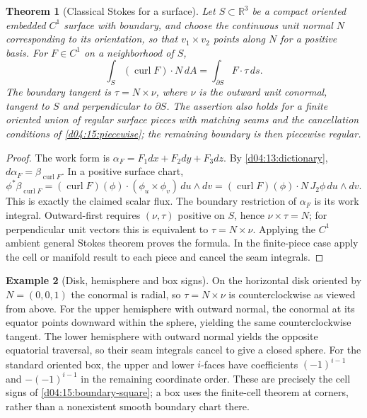 \documentclass[11pt,oneside,openany]{book}
\newtheorem{theorem}{Theorem}[chapter]
\theoremstyle{definition}
\newtheorem{example}[theorem]{Example}
\theoremstyle{remark}
\newcommand{\R}{\mathbb R}
\begin{document}
\begin{theorem}[Classical Stokes for a surface]\label{d04:12:surface-stokes}
Let $S\subset\R^3$ be a compact oriented embedded $C^1$ surface with
boundary, and choose the continuous unit normal $N$ corresponding to its
orientation, so that $v_1\times v_2$ points along $N$ for a positive basis.
For $F\in C^1$ on a neighborhood of $S$,
\[
 \int_S(\operatorname{curl}F)\cdot N\,dA
 =\int_{\partial S}F\cdot\tau\,ds.
\]
The boundary tangent is $\tau=N\times\nu$, where $\nu$ is the outward
unit conormal, tangent to $S$ and perpendicular to $\partial S$.
The assertion also holds for a finite oriented union of regular surface
pieces with matching seams and the cancellation conditions of
\cref{d04:15:piecewise}; the remaining boundary is then piecewise regular.
\end{theorem}
\begin{proof}
The work form is $\alpha_F=F_1dx+F_2dy+F_3dz$. By
\cref{d04:13:dictionary}, $d\alpha_F=\beta_{\operatorname{curl}F}$.
In a positive surface chart,
\[
 \phi^*\beta_{\operatorname{curl}F}
 =(\operatorname{curl}F)(\phi)\cdot(\phi_u\times\phi_v)\,du\wedge dv
 =(\operatorname{curl}F)(\phi)\cdot N\,J_2\phi\,du\wedge dv.
\]
This is exactly the claimed scalar flux. The boundary restriction of
$\alpha_F$ is its work integral. Outward-first requires $(\nu,\tau)$
positive on $S$, hence $\nu\times\tau=N$; for perpendicular unit vectors
this is equivalent to $\tau=N\times\nu$. Applying the $C^1$ ambient
general Stokes theorem proves the formula. In the finite-piece case apply
the cell or manifold result to each piece and cancel the seam integrals.
\end{proof}

\begin{example}[Disk, hemisphere and box signs]\label{d04:12:signs}
On the horizontal disk oriented by $N=(0,0,1)$ the conormal is radial,
so $\tau=N\times\nu$ is counterclockwise as viewed from above. For the
upper hemisphere with outward normal, the conormal at its equator points
downward within the sphere, yielding the same counterclockwise tangent.
The lower hemisphere with outward normal yields the opposite equatorial
traversal, so their seam integrals cancel to give a closed sphere.
For the standard oriented box, the upper and lower $i$-faces have coefficients
$(-1)^{i-1}$ and $-(-1)^{i-1}$ in the remaining coordinate order. These
are precisely the cell signs of \cref{d04:15:boundary-square}; a box uses
the finite-cell theorem at corners, rather than a nonexistent smooth
boundary chart there.
\end{example}
\end{document}
